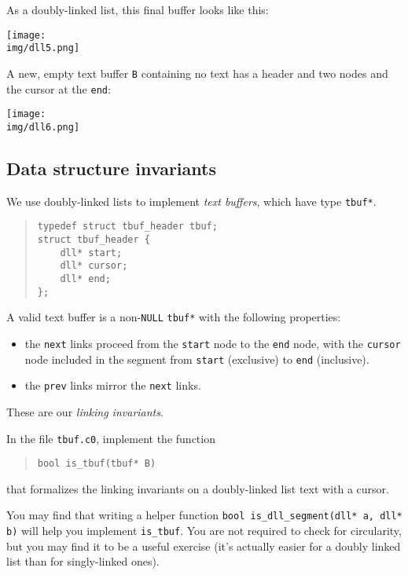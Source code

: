 \documentclass[12pt]{exam}
\begin{document}
As a doubly-linked list, this final buffer looks like this:
\begin{center}
  \texttt{[image: \\img/dll5.png]}
\end{center}\vspace{-2.5ex}\enlargethispage{5ex}
A new, empty text buffer \lstinline'B' containing no text has a header and
two nodes and the cursor at the \lstinline'end':
\begin{center}
  \texttt{[image: \\img/dll6.png]}
\end{center}


\subsection{Data structure invariants}

We use doubly-linked lists to implement \emph{text buffers}, which
have type \lstinline'tbuf*'.
\begin{quote}
\begin{lstlisting}[numbers=none]
typedef struct tbuf_header tbuf;
struct tbuf_header {
    dll* start;
    dll* cursor;
    dll* end;
};
\end{lstlisting}
\end{quote}
A valid text buffer is a non-\lstinline'NULL' \lstinline'tbuf*' with the
following properties:
\begin{itemize}
        \item the \lstinline'next' links proceed from the
          \lstinline'start' node to the \lstinline'end' node, with the
          \lstinline'cursor' node included in the segment from
          \lstinline'start' (exclusive) to \lstinline'end' (inclusive).
  \item the \lstinline'prev' links mirror the \lstinline'next' links.
\end{itemize}
These are our \emph{linking invariants}.

\begin{task}[5]
In the file \lstinline'tbuf.c0',
implement the function
\begin{quote}
\lstinline'bool is_tbuf(tbuf* B)'
\end{quote}

\noindent that formalizes the linking invariants on a doubly-linked
list text with a cursor.
\end{task}


You may find that writing a helper function
\lstinline'bool is_dll_segment(dll* a, dll* b)' will help you implement
\lstinline'is_tbuf'. You are not required to check for circularity, but
you may find it to be a useful exercise (it's actually easier for a
doubly linked list than for singly-linked ones).
\end{document}
